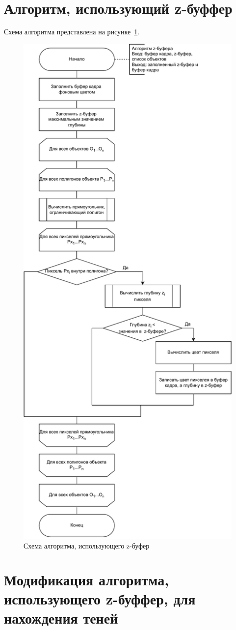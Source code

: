 \section{Алгоритм, использующий z-буффер}

Схема алгоритма представлена на рисунке~\ref{fig:z}.

\begin{figure}[h!]
	\centering
	\includegraphics[width=0.65\linewidth]{img/z}
	\caption{Схема алгоритма, использующего z-буфер}
	\label{fig:z}
\end{figure}
\clearpage

\section[Модификация алгоритма, использующего z-буффер, для нахождения теней]{Модификация алгоритма,\\использующего z-буффер, для\\нахождения теней}

